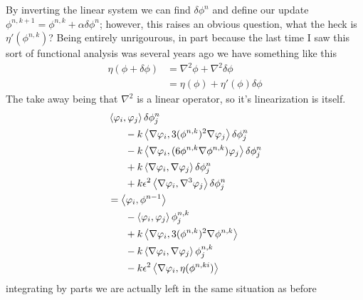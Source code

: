 \documentclass{article}
\newcommand\ang[1]{\left\langle #1 \right\rangle}
\begin{document}
By inverting the linear system we can find $\delta\phi^n$ and define our update
$\phi^{n,k+1} = \phi^{n,k} + \alpha\delta \phi^n$; however, this raises an obvious
question, what the heck is $\eta'(\phi^{n,k})$? Being entirely unrigourous,
in part because the last time I saw this sort of functional analysis was several
years ago we have something like this
\begin{align}
    \eta(\phi+\delta \phi) &= \nabla^2\phi + \nabla^2 \delta \phi\\
    &= \eta(\phi) + \eta'(\phi)\delta\phi
\end{align}
The take away being that $\nabla^2$ is a linear operator, so it's linearization
is itself.
\begin{align}
    &\ang{\varphi_i, \varphi_j}\delta\phi^n_j\\
    &\hspace{4ex}- k\ang{\nabla \varphi_i, 3(\phi^{n,k})^2\nabla\varphi_j}\delta\phi^n_j\\
    &\hspace{4ex}- k\ang{\nabla \varphi_i, (6\phi^{n,k}\nabla\phi^{n,k})\varphi_j}\delta\phi^n_j\\
    &\hspace{4ex}+ k\ang{\nabla \varphi_i, \nabla\varphi_j}\delta\phi^n_j\\
    &\hspace{4ex}+ k\epsilon^2\ang{\nabla\varphi_i, \nabla^3\varphi_j}\delta\phi^n_j\\
    &= \ang{\varphi_i, \phi^{n-1}}\\
    &\hspace{4ex}-\ang{\varphi_i, \varphi_j}\phi^{n,k}_j\\
    &\hspace{4ex}+k\ang{\nabla\varphi_i, 3(\phi^{n,k})^2\nabla\phi^{n,k}}\\
    &\hspace{4ex}-k\ang{\nabla\varphi_i, \nabla\varphi_j}\phi^{n,k}_j\\
    &\hspace{4ex}-k\epsilon^2\ang{\nabla\varphi_i,\eta(\phi^{n,ki})}
\end{align}
integrating by parts we are actually left in the same situation as before
\end{document}
